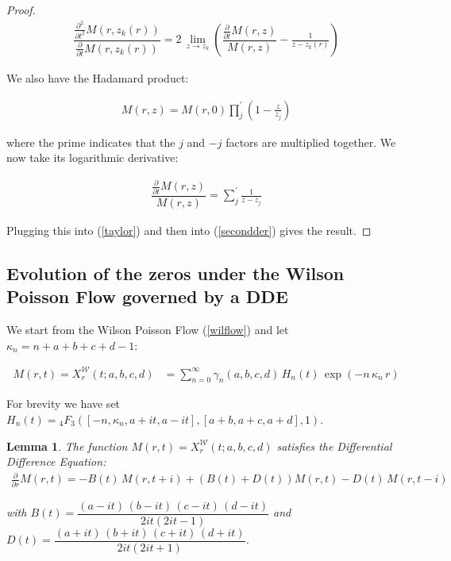 \documentclass[a4paper,11pt,twoside]{amsart}
\newtheorem{lemma}[theorem]{Lemma}
\newcommand{\verifiedeq}{=}
\newcommand{\defeq}{=}
\newcommand{\verifiedeq}{\stackrel{\checkmark}{=}}
\newcommand{\defeq}{\stackrel{\scriptscriptstyle \textnormal{def}}{=}}
\begin{document}
\begin{proof}
\begin{align}\label{taylor}
 \dfrac{\frac{\partial^2}{\partial t^2}M(r,z_k(r))}{\frac{\partial}{\partial t}M(r,z_k(r))} \verifiedeq 2\,\lim_{z\to z_k} \left(\dfrac{\frac{\partial}{\partial t}M(r,z)}{M(r,z)} -\frac{1}{z - z_k(r)} \right)
\end{align}

\pagebreak
We also have the Hadamard product: 

\begin{align}
  M(r,z) \verifiedeq M(r,0)\prod_j^{'}\left(1-\frac{z}{z_j}\right)
\end{align}

where the prime indicates that the $j$ and $-j$ factors are multiplied together. We now take its logarithmic derivative:

\begin{align}
  \dfrac{\frac{\partial}{\partial t}M(r,z)}{M(r,z)} \verifiedeq \sum_j^{'} \frac{1}{z-z_j}
\end{align}

Plugging this into (\ref{taylor}) and then into (\ref{secondder}) gives the result.
\end{proof}

\subsection{Evolution of the zeros under the Wilson Poisson Flow governed by a DDE} \label{Wilsonlawspoissonflow}

We start from the Wilson Poisson Flow (\ref{wilflow}) and let $\kappa_n = n+a+b+c+d-1$: 

\begin{align}
  M(r,t) \verifiedeq X^\mathcal{W}_{r}(t;a,b,c,d) &= \sum_{n=0}^\infty \gamma_n(a,b,c,d)\,H_n(t)\,\exp(-n\,\kappa_n\,r)
\end{align} 

For brevity we have set $H_n(t) \defeq {}_4F_3\left(\left[-n, \kappa_n,a+it, a- it\right], \left[a+b, a+c, a+d\right], 1\right)$.
\begin{lemma}\label{proofWil1} The function $M(r,t) \verifiedeq X^\mathcal{W}_{r}(t;a,b,c,d)$ satisfies the Differential Difference Equation: 
\begin{align}
 \frac{\partial}{\partial r}M(r,t) \verifiedeq -B(t)\,M(r,t+i) +\left(B(t)+D(t)\right)M(r,t)- D(t)\,M(r,t-i) \label{WilDDE}
\end{align}

 with $B(t) \verifiedeq \dfrac{(a-it)\,(b-it)\,(c-it)\,(d-it)}{2it(2it-1)}$ and $D(t)=\dfrac{(a+it)\,(b+it)\,(c+it)\,(d+it)}{2it(2it+1)}$.
\end{lemma}
\end{document}
